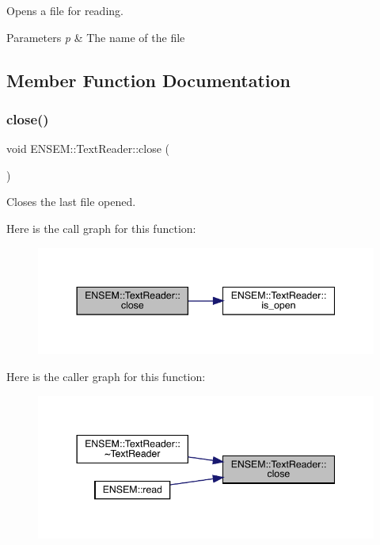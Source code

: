 Opens a file for reading. 
\begin{DoxyParams}{Parameters}
{\em p} & The name of the file \\
\hline
\end{DoxyParams}


\subsection{Member Function Documentation}
\mbox{\label{classENSEM_1_1TextReader_a19f171518a1c7a06739d2d7de016f346}} 
\subsubsection{\texorpdfstring{close()}{close()}\hspace{0.1cm}{\footnotesize\ttfamily [1/3]}}
{\footnotesize\ttfamily void E\+N\+S\+E\+M\+::\+Text\+Reader\+::close (\begin{DoxyParamCaption}{ }\end{DoxyParamCaption})}



Closes the last file opened. 

Here is the call graph for this function\+:
\nopagebreak
\begin{figure}[H]
\begin{center}
\leavevmode
\includegraphics[width=344pt]{d4/d23/classENSEM_1_1TextReader_a19f171518a1c7a06739d2d7de016f346_cgraph}
\end{center}
\end{figure}
Here is the caller graph for this function\+:
\nopagebreak
\begin{figure}[H]
\begin{center}
\leavevmode
\includegraphics[width=344pt]{d4/d23/classENSEM_1_1TextReader_a19f171518a1c7a06739d2d7de016f346_icgraph}
\end{center}
\end{figure}
\mbox{\label{classENSEM_1_1TextReader_a19f171518a1c7a06739d2d7de016f346}} 
